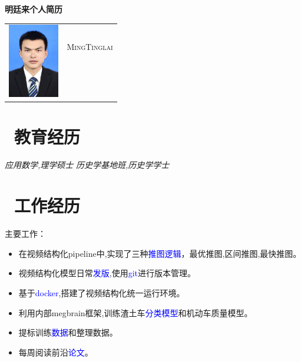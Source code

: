 \documentclass{resume}
\begin{document}
\begin{center} 
\Large\textbf{明廷来个人简历}
\end{center}

{
\Large{
  \begin{tabu}{ c l }
    & \scshape{MingTinglai} \\ 
    & \\ 
    & \\
    & 
  \end{tabu}
}
}

\section{\textcolor{blue}\faGraduationCap\ 教育经历}
\textit{应用数学,理学硕士}
\textit{历史学基地班,历史学学士} 

\section{\textcolor{blue}\faUsers\ 工作经历}
主要工作：
\begin{itemize}
  \item 在视频结构化pipeline中,实现了三种\textcolor{blue}{推图逻辑}，最优推图,区间推图,最快推图。
  \item 视频结构化模型日常\textcolor{blue}{发版},使用\textcolor{blue}{git}进行版本管理。
  \item 基于\textcolor{blue}{docker},搭建了视频结构化统一运行环境。
  \item 利用内部megbrain框架,训练渣土车\textcolor{blue}{分类模型}和机动车质量模型。
  \item 提标训练\textcolor{blue}{数据}和整理数据。
  \item 每周阅读前沿\textcolor{blue}{论文}。
\end{itemize}
\end{document}
